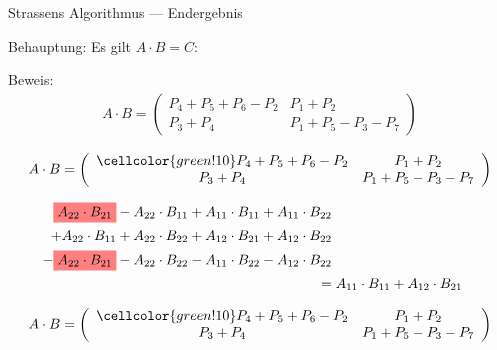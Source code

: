 \documentclass[aspectratio=169]{beamer}
\newcommand{\highlight}[1]{%
  \colorbox{red!50}{$\displaystyle#1$}}
\begin{document}
\begin{frame}{Strassens Algorithmus --- Endergebnis}
\uncover<+-> {
 {
Behauptung: Es gilt $A\cdot B = C$:

\bigskip
Beweis:
        \begin{align*}
            A\cdot B =
            \left(\begin{array}{cc}
                P_{4} + P_{5} + P_{6} - P_{2} & P_{1} + P_{2} \\
                P_{3} + P_{4} & P_{1} + P_{5} - P_{3} - P_{7} 
            \end{array}\right)
        \end{align*}
        } {
         {
            \begin{align*}
                A\cdot B =
                \left(\begin{array}{cc}
                    \cellcolor{green!10} P_{4} + P_{5} + P_{6} - P_{2} & P_{1} + P_{2} \\
                    P_{3} + P_{4} & P_{1} + P_{5} - P_{3} - P_{7} 
                \end{array}\right)
            \end{align*}
        
            \begin{align*}
                \highlight{A_{22} \cdot B_{21}} - A_{22} \cdot B_{11} + A_{11} \cdot B_{11} + A_{11} \cdot B_{22} \\ 
                + A_{22} \cdot B_{11} + A_{22} \cdot B_{22} + A_{12} \cdot B_{21} + A_{12} \cdot B_{22} \\ 
                - \highlight{A_{22} \cdot B_{21}} - A_{22} \cdot B_{22} - A_{11} \cdot B_{22} - A_{12} \cdot B_{22} \\
                \;= &\;A_{11} \cdot B_{11} + A_{12} \cdot B_{21}
            \end{align*}} {
         {
            \begin{align*}
                A\cdot B =
                \left(\begin{array}{cc}
                    \cellcolor{green!10} P_{4} + P_{5} + P_{6} - P_{2} & P_{1} + P_{2} \\
                    P_{3} + P_{4} & P_{1} + P_{5} - P_{3} - P_{7} 
                \end{array}\right)
            \end{align*}
            
}}}}
\end{frame}
\end{document}
